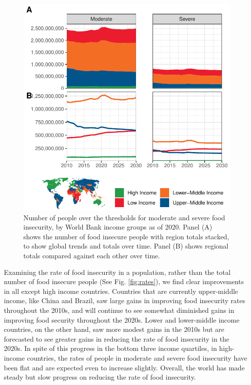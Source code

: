 \documentclass{article}
\begin{document}
\begin{figure}[H]
  \centering
  \includegraphics[width=\linewidth]{img/TimeSeries.pdf}
  \caption{Number of people over the thresholds for moderate and severe food insecurity, by World Bank income groups as of 2020.  Panel (A) shows the number of food insecure people with region totals stacked, to show global trends and totals over time.  Panel (B) shows regional totals compared against each other over time.}
  \label{fig:timeseries}
\end{figure}

Examining the rate of food insecurity in a population, rather than the total number of food insecure people (See Fig. \ref{fig:rates}), we find clear improvements in all except high income countries.  Countries that are currently upper-middle income, like China and Brazil, saw large gains in improving food insecurity rates throughout the 2010s, and will continue to see somewhat diminished gains in improving food security throughout the 2020s.  Lower and lower-middle income countries, on the other hand, saw more modest gains in the 2010s but are forecasted to see greater gains in reducing the rate of food insecurity in the 2020s.  In spite of this progress in the bottom three income quartiles, in high-income countries, the rates of people in moderate and severe food insecurity have been flat and are expected even to increase slightly.  Overall, the world has made steady but slow progress on reducing the rate of food insecurity.
\end{document}
